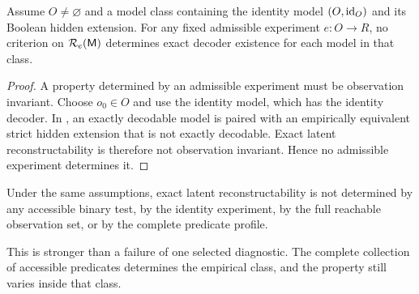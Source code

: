 \begin{theorem}
Assume \(O\neq\varnothing\) and a model class containing the identity model \((O,\operatorname{id}_O)\) and its Boolean hidden extension. For any fixed admissible experiment \(e:O\to R\), no criterion on \(\mathcal R_e(\mathsf M)\) determines exact decoder existence for each model in that class.
\label{thm:noexperimentdecoder}
\end{theorem}

\begin{proof}
A property determined by an admissible experiment must be observation invariant. Choose \(o_0\in O\) and use the identity model, which has the identity decoder. In , an exactly decodable model is paired with an empirically equivalent strict hidden extension that is not exactly decodable. Exact latent reconstructability is therefore not observation invariant. Hence no admissible experiment determines it.
\end{proof}
\begin{corollary}
Under the same assumptions, exact latent reconstructability is not determined by any accessible binary test, by the identity experiment, by the full reachable observation set, or by the complete predicate profile.
\end{corollary}
This is stronger than a failure of one selected diagnostic. The complete collection of accessible predicates determines the empirical class, and the property still varies inside that class.
